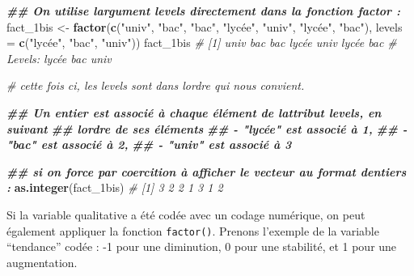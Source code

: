 \documentclass[
]{book}
\newenvironment{Shaded}{\begin{snugshade}}{\end{snugshade}}
\newcommand{\AttributeTok}[1]{\textcolor[rgb]{0.13,0.29,0.53}{#1}}
\newcommand{\CommentTok}[1]{\textcolor[rgb]{0.56,0.35,0.01}{\textit{#1}}}
\newcommand{\DocumentationTok}[1]{\textcolor[rgb]{0.56,0.35,0.01}{\textbf{\textit{#1}}}}
\newcommand{\FunctionTok}[1]{\textcolor[rgb]{0.13,0.29,0.53}{\textbf{#1}}}
\newcommand{\NormalTok}[1]{#1}
\newcommand{\OtherTok}[1]{\textcolor[rgb]{0.56,0.35,0.01}{#1}}
\newcommand{\StringTok}[1]{\textcolor[rgb]{0.31,0.60,0.02}{#1}}
\begin{document}
\begin{Shaded}
\begin{Highlighting}[]
\DocumentationTok{\#\# On utilise l\textquotesingle{}argument \textquotesingle{}levels\textquotesingle{} directement dans la fonction \textquotesingle{}factor\textquotesingle{} :}
\NormalTok{fact\_1bis }\OtherTok{\textless{}{-}} \FunctionTok{factor}\NormalTok{(}\FunctionTok{c}\NormalTok{(}\StringTok{"univ"}\NormalTok{, }\StringTok{"bac"}\NormalTok{, }\StringTok{"bac"}\NormalTok{, }\StringTok{"lycée"}\NormalTok{, }\StringTok{"univ"}\NormalTok{, }\StringTok{"lycée"}\NormalTok{, }\StringTok{"bac"}\NormalTok{),}
                    \AttributeTok{levels =} \FunctionTok{c}\NormalTok{(}\StringTok{"lycée"}\NormalTok{, }\StringTok{"bac"}\NormalTok{, }\StringTok{"univ"}\NormalTok{))}
\NormalTok{fact\_1bis}
\CommentTok{\# [1] univ  bac   bac   lycée univ  lycée bac  }
\CommentTok{\# Levels: lycée bac univ}

\CommentTok{\# cette fois ci, les levels sont dans l\textquotesingle{}ordre qui nous convient.}

\DocumentationTok{\#\# Un entier est associé à chaque élément de l\textquotesingle{}attribut \textquotesingle{}levels\textquotesingle{}, en suivant }
\DocumentationTok{\#\# l\textquotesingle{}ordre de ses éléments }
\DocumentationTok{\#\#  {-} "lycée" est associé à 1,}
\DocumentationTok{\#\#  {-} "bac" est associé à 2,}
\DocumentationTok{\#\#  {-} "univ" est associé à 3}

\DocumentationTok{\#\# si on force par coercition à afficher le vecteur au format d\textquotesingle{}entiers :}
\FunctionTok{as.integer}\NormalTok{(fact\_1bis)}
\CommentTok{\# [1] 3 2 2 1 3 1 2}
\end{Highlighting}
\end{Shaded}

Si la variable qualitative a été codée avec un codage numérique, on peut également appliquer la fonction \texttt{factor()}. Prenons l'exemple de la variable ``tendance'' codée : -1 pour une diminution, 0 pour une stabilité, et 1 pour une augmentation.
\end{document}
